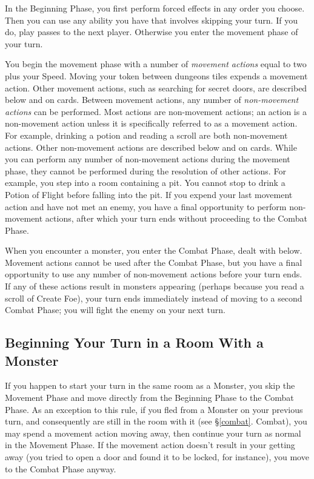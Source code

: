 \documentclass{book}
\begin{document}
In the Beginning Phase, you first perform forced effects in any order you choose. Then you can use any ability you have that involves skipping your turn. If you do, play passes to the next player. Otherwise you enter the movement phase of your turn.

You begin the movement phase with a number of \emph{movement actions} equal to two plus your Speed. Moving your token between dungeons tiles expends a movement action. Other movement actions, such as searching for secret doors, are described below and on cards.
Between movement actions, any number of \emph{non-movement actions} can be performed. Most actions are non-movement actions; an action is a non-movement action unless it is specifically referred to as a movement action.  For example, drinking a potion and reading a scroll are both non-movement actions. Other non-movement actions are described below and on cards.
While you can perform any number of non-movement actions during the movement phase, they cannot be performed during the resolution of other actions. For example, you step into a room containing a pit. You cannot stop to drink a Potion of Flight before falling into the pit.
If you expend your last movement action and have not met an enemy, you have a final opportunity to perform non-movement actions, after which your turn ends without proceeding to the Combat Phase.

When you encounter a monster, you enter the Combat Phase, dealt with below. Movement actions cannot be used after the Combat Phase, but you have a final opportunity to use any number of non-movement actions before your turn ends. If any of these actions result in monsters appearing (perhaps because you read a scroll of Create Foe), your turn ends immediately instead of moving to a second Combat Phase; you will fight the enemy on your next turn.

\subsection{Beginning Your Turn in a Room With a Monster} \label{beginRoomMonster}

If you happen to start your turn in the same room as a Monster, you skip the Movement Phase and move directly from the Beginning Phase to the Combat Phase. As an exception to this rule, if you fled from a Monster on your previous turn, and consequently are still in the room with it (see §\ref{combat}. Combat), you may spend a movement action moving away, then continue your turn as normal in the Movement Phase. If the movement action doesn’t result in your getting away (you tried to open a door and found it to be locked, for instance), you move to the Combat Phase anyway.
\end{document}

